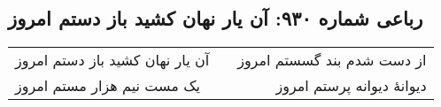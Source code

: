 \begin{center}
\section*{رباعی شماره ۹۳۰: آن یار نهان کشید باز دستم امروز}
\label{sec:0930}
\begin{longtable}{l p{0.5cm} r}
آن یار نهان کشید باز دستم امروز
&&
از دست شدم بند گسستم امروز
\\
یک مست نیم هزار مستم امروز
&&
دیوانهٔ دیوانه پرستم امروز
\\
\end{longtable}
\end{center}
